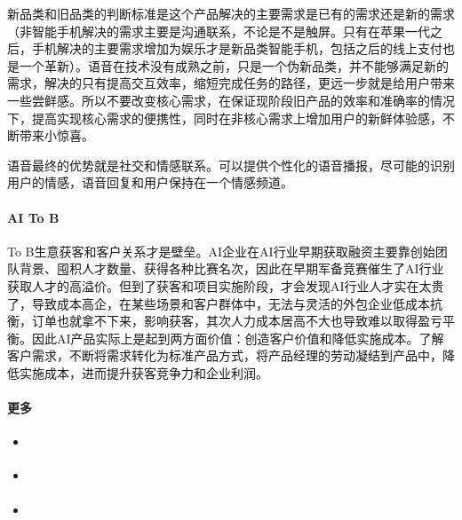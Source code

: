 \documentclass[letterpaper,10pt,english]{sphinxmanual}
\begin{document}
新品类和旧品类的判断标准是这个产品解决的主要需求是已有的需求还是新的需求（非智能手机解决的需求主要是沟通联系，不论是不是触屏。只有在苹果一代之后，手机解决的主要需求增加为娱乐才是新品类智能手机，包括之后的线上支付也是一个革新）。语音在技术没有成熟之前，只是一个伪新品类，并不能够满足新的需求，解决的只有提高交互效率，缩短完成任务的路径，更远一步就是给用户带来一些尝鲜感。所以不要改变核心需求，在保证现阶段旧产品的效率和准确率的情况下，提高实现核心需求的便携性，同时在非核心需求上增加用户的新鲜体验感，不断带来小惊喜。

语音最终的优势就是社交和情感联系。可以提供个性化的语音播报，尽可能的识别用户的情感，语音回复和用户保持在一个情感频道。


\paragraph{AI To B}
\label{\detokenize{chapter_introduction/2B:ai-to-b}}
To
B生意获客和客户关系才是壁垒。AI企业在AI行业早期获取融资主要靠创始团队背景、囤积人才数量、获得各种比赛名次，因此在早期军备竞赛催生了AI行业获取人才的高溢价。但到了获客和项目实施阶段，才会发现AI行业人才实在太贵了，导致成本高企，在某些场景和客户群体中，无法与灵活的外包企业低成本抗衡，订单也就拿不下来，影响获客，其次人力成本居高不大也导致难以取得盈亏平衡。因此AI产品实际上是起到两方面价值：创造客户价值和降低实施成本。了解客户需求，不断将需求转化为标准产品方式，将产品经理的劳动凝结到产品中，降低实施成本，进而提升获客竞争力和企业利润。%
\begin{footnote}[95]\sphinxAtStartFootnote
{}
%
\end{footnote}


\paragraph{更多}
\label{\detokenize{chapter_introduction/2B:id40}}\begin{itemize}
\item {} 
%
\begin{footnote}[96]\sphinxAtStartFootnote
{}
%
\end{footnote}

\item {} 
%
\begin{footnote}[97]\sphinxAtStartFootnote
{}
%
\end{footnote}

\item {} 
%
\begin{footnote}[98]\sphinxAtStartFootnote
{}
%
\end{footnote}

\end{itemize}
\end{document}
